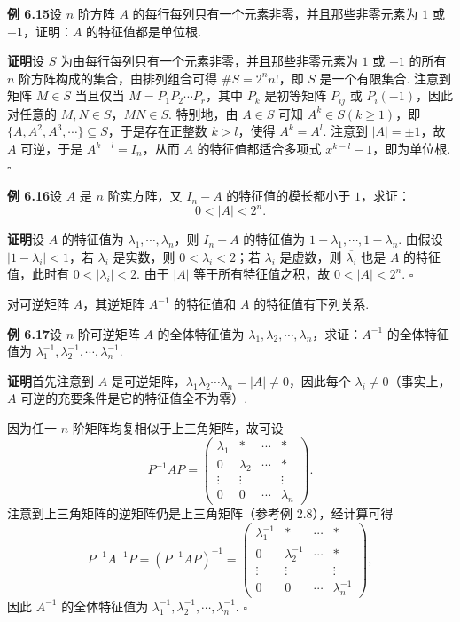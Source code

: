 \documentclass[UTF8,12pt,a4paper,fontset=fandol]{ctexart}
\begin{document}
\noindent\textbf{例 6.15}\quad 设 $n$ 阶方阵 $A$ 的每行每列只有一个元素非零，并且那些非零元素为 $1$ 或 $-1$，证明：$A$ 的特征值都是单位根.

\noindent\textbf{证明}\quad 设 $S$ 为由每行每列只有一个元素非零，并且那些非零元素为 $1$ 或 $-1$ 的所有 $n$ 阶方阵构成的集合，由排列组合可得 $\#S=2^n n!$，即 $S$ 是一个有限集合. 注意到矩阵 $M\in S$ 当且仅当 $M=P_1P_2\cdots P_r$，其中 $P_k$ 是初等矩阵 $P_{ij}$ 或 $P_i(-1)$，因此对任意的 $M,N\in S$，$MN\in S$. 特别地，由 $A\in S$ 可知 $A^k\in S(k\ge 1)$，即 $\{A,A^2,A^3,\cdots\}\subseteq S$，于是存在正整数 $k>l$，使得 $A^k=A^l$. 注意到 $|A|=\pm 1$，故 $A$ 可逆，于是 $A^{k-l}=I_n$，从而 $A$ 的特征值都适合多项式 $x^{k-l}-1$，即为单位根. $\square$

\noindent\textbf{例 6.16}\quad 设 $A$ 是 $n$ 阶实方阵，又 $I_n-A$ 的特征值的模长都小于 $1$，求证：
\[
0<|A|<2^n.
\]

\noindent\textbf{证明}\quad 设 $A$ 的特征值为 $\lambda_1,\cdots,\lambda_n$，则 $I_n-A$ 的特征值为 $1-\lambda_1,\cdots,1-\lambda_n$. 由假设 $|1-\lambda_i|<1$，若 $\lambda_i$ 是实数，则 $0<\lambda_i<2$；若 $\lambda_i$ 是虚数，则 $\overline{\lambda_i}$ 也是 $A$ 的特征值，此时有 $0<|\lambda_i|<2$. 由于 $|A|$ 等于所有特征值之积，故 $0<|A|<2^n$. $\square$

对可逆矩阵 $A$，其逆矩阵 $A^{-1}$ 的特征值和 $A$ 的特征值有下列关系.

\noindent\textbf{例 6.17}\quad 设 $n$ 阶可逆矩阵 $A$ 的全体特征值为 $\lambda_1,\lambda_2,\cdots,\lambda_n$，求证：$A^{-1}$ 的全体特征值为 $\lambda_1^{-1},\lambda_2^{-1},\cdots,\lambda_n^{-1}$.

\noindent\textbf{证明}\quad 首先注意到 $A$ 是可逆矩阵，$\lambda_1\lambda_2\cdots\lambda_n=|A|\ne 0$，因此每个 $\lambda_i\ne 0$（事实上，$A$ 可逆的充要条件是它的特征值全不为零）.

因为任一 $n$ 阶矩阵均复相似于上三角矩阵，故可设
\[
P^{-1}AP=\left(\begin{array}{cccc}
\lambda_1 & * & \cdots & *\\
0 & \lambda_2 & \cdots & *\\
\vdots & \vdots & & \vdots\\
0 & 0 & \cdots & \lambda_n
\end{array}\right).
\]
注意到上三角矩阵的逆矩阵仍是上三角矩阵（参考例 2.8），经计算可得
\[
P^{-1}A^{-1}P=(P^{-1}AP)^{-1}
=\left(\begin{array}{cccc}
\lambda_1^{-1} & * & \cdots & *\\
0 & \lambda_2^{-1} & \cdots & *\\
\vdots & \vdots & & \vdots\\
0 & 0 & \cdots & \lambda_n^{-1}
\end{array}\right),
\]
因此 $A^{-1}$ 的全体特征值为 $\lambda_1^{-1},\lambda_2^{-1},\cdots,\lambda_n^{-1}$. $\square$
\end{document}
